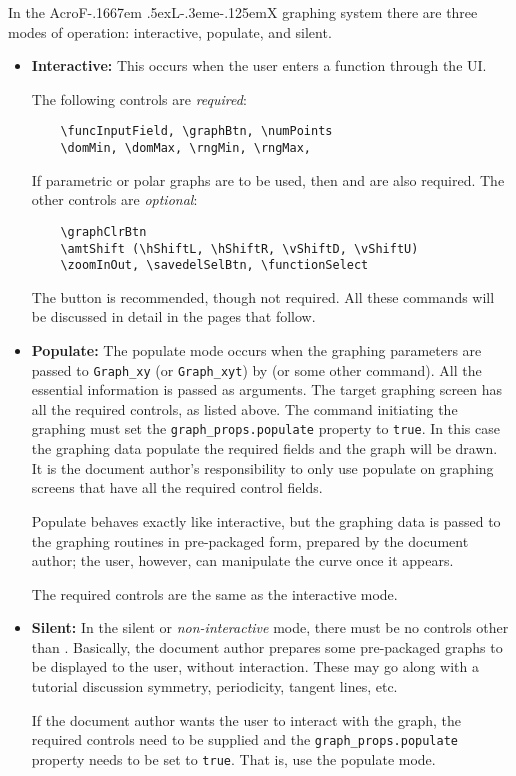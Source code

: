 \documentclass{article}
\makeatletter
\def\AcroFLeX{AcroF\kern-.1667em
    \lower.5ex\hbox{L}\kern-.3eme\kern-.125emX\@}
\makeatother
\begin{document}
In the {\AcroFLeX} graphing system there are three modes of
operation: interactive, populate, and silent.
\begin{itemize}
\item \textbf{Interactive:} This occurs when the user enters a
function through the UI.

The following controls are \emph{required}:
\begin{Verbatim}
    \funcInputField, \graphBtn, \numPoints
    \domMin, \domMax, \rngMin, \rngMax,
\end{Verbatim}
If parametric or polar graphs are to be used,
then  and  are also required. The other
controls are \emph{optional}:
\begin{Verbatim}
    \graphClrBtn
    \amtShift (\hShiftL, \hShiftR, \vShiftD, \vShiftU)
    \zoomInOut, \savedelSelBtn, \functionSelect
\end{Verbatim}
The  button is recommended, though not required.
All these commands will be discussed in detail in the pages that follow.

\item \textbf{Populate:} The populate mode occurs when the graphing
    parameters are passed to \texttt{Graph\_xy} (or \texttt{Graph\_xyt}) by
     (or some other command). All the essential information
    is passed as arguments. The target graphing screen has all the required
    controls, as listed above. The command initiating the graphing must set
    the \texttt{graph\_props.populate} property to \texttt{true}. In this
    case the graphing data populate the required fields and the graph will
    be drawn. It is the document author's responsibility to only use
    populate on graphing screens that have all the required control fields.

    Populate behaves exactly like interactive, but the graphing data is
    passed to the graphing routines in pre-packaged form, prepared by the
    document author; the user, however, can manipulate the curve once it
    appears.

    The required controls are the same as the interactive mode.

\item \textbf{Silent:} In the silent or \emph{non-interactive} mode, there
    must be no controls other than .  Basically, the
    document author prepares some pre-packaged graphs to be displayed to
    the user, without interaction. These may go along with a tutorial
    discussion symmetry, periodicity, tangent lines, etc.

    If the document author wants the user to interact with the graph, the
    required controls need to be supplied and the
    \texttt{graph\_props.populate} property needs to be set to \texttt{true}.
    That is, use the populate mode.

\end{itemize}
\end{document}
